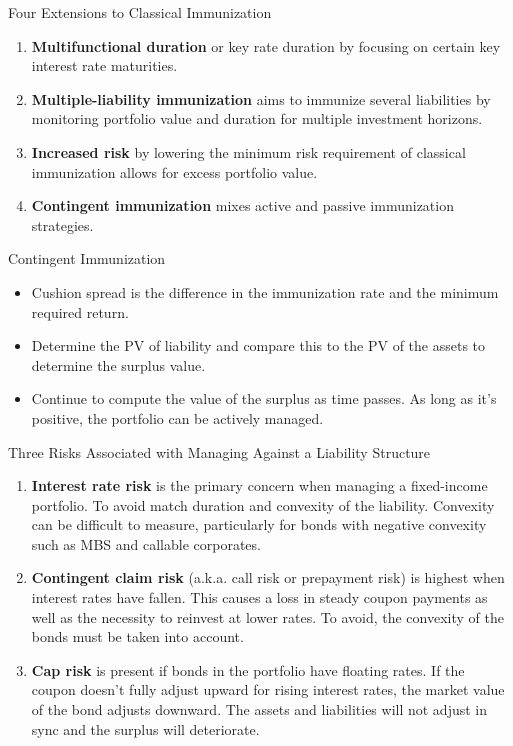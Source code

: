 \documentclass[../custom]{flashcards}
\begin{document}
\begin{flashcard}{Four Extensions to Classical Immunization}
    \begin{enumerate}
        \item \textbf{Multifunctional duration} or key rate duration by focusing on certain key interest rate maturities.
        \item \textbf{Multiple-liability immunization} aims to immunize several liabilities by monitoring portfolio value and duration for multiple investment horizons.
        \item \textbf{Increased risk} by lowering the minimum risk requirement of classical immunization allows for excess portfolio value.
        \item \textbf{Contingent immunization} mixes active and passive immunization strategies.
    \end{enumerate}
\end{flashcard}

\begin{flashcard}{Contingent Immunization}
    \begin{itemize}
        \item Cushion spread is the difference in the immunization rate and the minimum required return.
        \item Determine the PV of liability and compare this to the PV of the assets to determine the surplus value.
        \item Continue to compute the value of the surplus as time passes. As long as it's positive, the portfolio can be actively managed.
    \end{itemize}
\end{flashcard}

\begin{flashcard}{Three Risks Associated with Managing Against a Liability Structure}
    \begin{enumerate}
        \item \textbf{Interest rate risk} is the primary concern when managing a fixed-income portfolio. To avoid match duration and convexity of the liability. Convexity can be difficult to measure, particularly for bonds with negative convexity such as MBS and callable corporates.
        \item \textbf{Contingent claim risk} (a.k.a. call risk or prepayment risk) is highest when interest rates have fallen. This causes a loss in steady coupon payments as well as the necessity to reinvest at lower rates. To avoid, the convexity of the bonds must be taken into account.
        \item \textbf{Cap risk} is present if bonds in the portfolio have floating rates. If the coupon doesn't fully adjust upward for rising interest rates, the market value of the bond adjusts downward. The assets and liabilities will not adjust in sync and the surplus will deteriorate.
    \end{enumerate}
\end{flashcard}
\end{document}
